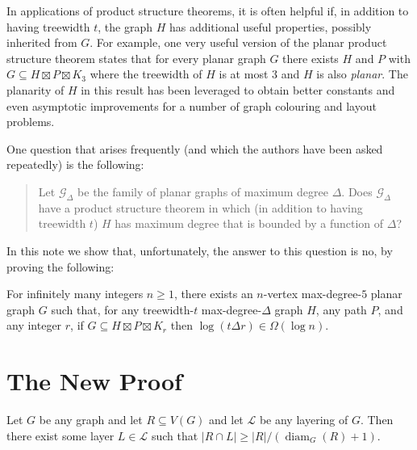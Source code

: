 \documentclass{patmorin}
\DeclareMathOperator{\diam}{diam}
\begin{document}
In applications of product structure theorems, it is often helpful if, in addition to having treewidth $t$, the graph $H$ has additional useful properties, possibly inherited from $G$.  For example, one very useful version of the planar product structure theorem states that for every planar graph $G$ there exists $H$ and $P$ with $G\subseteq H\boxtimes P\boxtimes K_3$ where the treewidth of $H$ is at most $3$ and $H$ is also \emph{planar}.  The planarity of $H$ in this result has been leveraged to obtain better constants and even asymptotic improvements for a number of graph colouring and layout problems.

One question that arises frequently (and which the authors have been asked repeatedly) is the following:
\begin{quote}
  Let $\mathcal{G}_\Delta$ be the family of planar graphs of maximum degree $\Delta$.  Does $\mathcal{G}_\Delta$ have a product structure theorem in which (in addition to having treewidth $t$) $H$ has maximum degree that is bounded by a function of $\Delta$?
\end{quote}
In this note we show that, unfortunately, the answer to this question is no, by proving the following:

\begin{thm}\label{treewidth_1_bounded_degree}
  For infinitely many integers $n\ge 1$, there exists an $n$-vertex max-degree-$5$ planar graph $G$ such that, for any treewidth-$t$ max-degree-$\Delta$ graph $H$, any path $P$, and any integer $r$,  if $G\subseteq H\boxtimes P\boxtimes K_r$ then $\log(t\Delta r)\in\Omega(\log n)$.
\end{thm}

\section{The New Proof}


\begin{obs}\label{diameter_spread}
  Let $G$ be any graph and let $R\subseteq V(G)$ and let $\mathcal{L}$ be any layering of $G$.  Then there exist some layer $L\in\mathcal{L}$ such that $|R\cap L|\ge |R|/(\diam_G(R)+1)$.
\end{obs}
\end{document}
